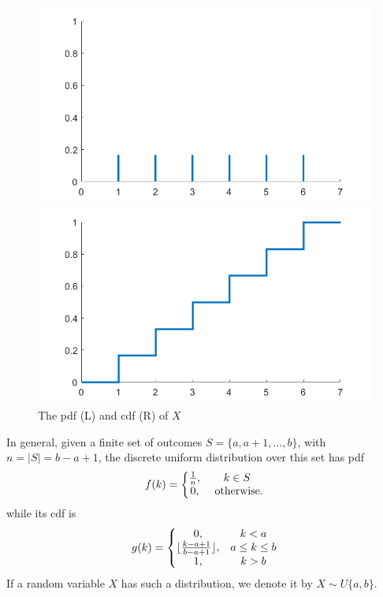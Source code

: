 \begin{myexample}
\begin{figure}[htbp]
 \begin{minipage}{.5\textwidth}
        \centering
	\includegraphics[width=0.9\linewidth]{fig/2_dice_pdf}
    \end{minipage}
    \begin{minipage}{0.5\textwidth}
        \centering
	\includegraphics[width=0.9\linewidth]{fig/2_dice_cdf}
    \end{minipage}	
    \caption{The pdf (L) and cdf (R) of $X$\label{fig:2_dice_pdf}}
\end{figure}


\end{myexample}

In general, given a finite set of outcomes $S = \{a,a + 1,\ldots,b\}$, with $n = |S| = b-a+1$, the discrete uniform distribution over this set has pdf \[ f(k) = \left\{ \begin{matrix} \frac{1}{n}, & k \in S \cr 0, & \text{ otherwise.} \end{matrix} \right.\]
while its cdf is \[ g(k) = \left\{ \begin{matrix} 0, & k < a \cr \lfloor \frac{k - a + 1}{b - a + 1} \rfloor, & a \leq k \leq b \cr 1, & k > b \end{matrix} \right. \]
If a random variable $X$ has such a distribution, we denote it by $X \sim U\{a,b\}$.


